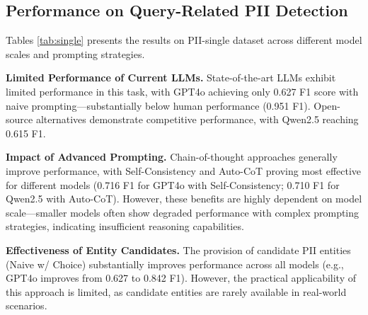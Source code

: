 

\subsection{Performance on Query-Related PII Detection}
Tables \ref{tab:single} presents the results on PII-single dataset across different model scales and prompting strategies. 

\noindent\textbf{Limited Performance of Current LLMs.} State-of-the-art LLMs exhibit limited performance in this task, with GPT4o achieving only 0.627 F1 score with naive prompting—substantially below human performance (0.951 F1). Open-source alternatives demonstrate competitive performance, with Qwen2.5 reaching 0.615 F1.

\noindent\textbf{Impact of Advanced Prompting.} Chain-of-thought approaches generally improve performance, with Self-Consistency and Auto-CoT proving most effective for different models (0.716 F1 for GPT4o with Self-Consistency; 0.710 F1 for Qwen2.5 with Auto-CoT). However, these benefits are highly dependent on model scale—smaller models often show degraded performance with complex prompting strategies, indicating insufficient reasoning capabilities.


\noindent\textbf{Effectiveness of Entity Candidates.} The provision of candidate PII entities (Naive w/ Choice) substantially improves performance across all models (e.g., GPT4o improves from 0.627 to 0.842 F1). However, the practical applicability of this approach is limited, as candidate entities are rarely available in real-world scenarios.


